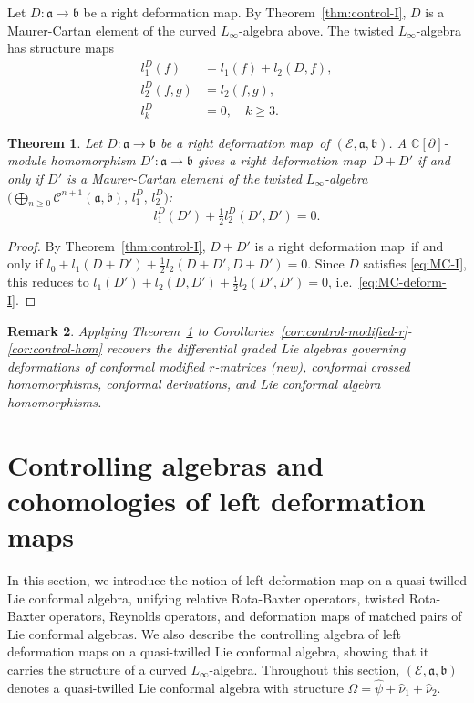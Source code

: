 \documentclass[a4paper,11pt]{article}
\def\Rg{\mathbb{C}[\partial]}
\def\Ep{\mathcal{E}}
\def\Vs{\mathfrak{a}}
\def\Ws{\mathfrak{b}}
\def\str{\Omega}
\def\smu{\widehat{\nu}_1}
\def\smv{\widehat{\nu}_2}
\def\shf{\widehat{\psi}}
\def\Cch{\mathscr{C}}
\numberwithin{equation}{section}
\newtheorem{theorem}{Theorem}[section]
\newtheorem{remark}[theorem]{Remark}
\begin{document}
Let $D:\Vs\to\Ws$ be a right deformation map.  By Theorem~\ref{thm:control-I}, $D$ is
a Maurer-Cartan element of the curved $L_\infty$-algebra above.  The
twisted $L_\infty$-algebra \cite{DSV,Get} has structure maps
\begin{align}
  l_1^D(f) &= l_1(f) + l_2(D,f), \label{eq:l1D-I}\\
  l_2^D(f,g) &= l_2(f,g), \label{eq:l2D-I}\\
  l_k^D &= 0, \quad k\geq3. \label{eq:lkD-I}
\end{align}
 
\begin{theorem}\label{thm:deform-DmapI}
Let $D:\Vs\to\Ws$ be a right deformation map\ of $(\Ep,\Vs,\Ws)$.  A $\Rg$-module
homomorphism $D':\Vs\to\Ws$ gives a right deformation map\ $D+D'$ if and only if $D'$
is a Maurer-Cartan element of the twisted $L_\infty$-algebra
$\bigl(\bigoplus_{n\geq0}\Cch^{n+1}(\Vs,\Ws),\,l_1^D,\,l_2^D\bigr)$:
\begin{equation}\label{eq:MC-deform-I}
  l_1^D(D') + \tfrac{1}{2}l_2^D(D',D') = 0.
\end{equation}
\end{theorem}
 
\begin{proof}
By Theorem~\ref{thm:control-I}, $D+D'$ is a right deformation map\ if and only if
$l_0+l_1(D+D')+\frac{1}{2}l_2(D+D',D+D')=0$.  Since $D$ satisfies
\eqref{eq:MC-I}, this reduces to
$l_1(D')+l_2(D,D')+\frac{1}{2}l_2(D',D')=0$, i.e.\ \eqref{eq:MC-deform-I}.
\end{proof}
 
\begin{remark}
Applying Theorem~\ref{thm:deform-DmapI} to
Corollaries~\ref{cor:control-modified-r}-\ref{cor:control-hom}
recovers the differential graded Lie algebras governing deformations of
conformal modified $r$-matrices (new), conformal crossed homomorphisms,
conformal derivations, and Lie conformal  algebra homomorphisms.
\end{remark}

\section{Controlling algebras and cohomologies of left deformation maps}
\label{sec:typeII}
 
In this section, we introduce the notion of left deformation map on a quasi-twilled Lie conformal algebra, unifying relative Rota-Baxter operators, twisted Rota-Baxter operators, Reynolds operators, and deformation maps of matched pairs of Lie conformal algebras. We also describe the controlling algebra of left deformation maps on a quasi-twilled Lie conformal algebra, showing that it carries the structure of a curved $L_\infty$-algebra. Throughout this section, $(\Ep,\Vs,\Ws)$ denotes a quasi-twilled Lie conformal algebra with structure $\str=\shf+\smu+\smv$. 
 
\end{document}
